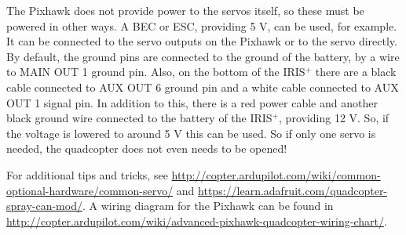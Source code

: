 \documentclass[titlepage,11pt,a4paper]{article}
\begin{document}
The Pixhawk does not provide power to the servos itself, so these must
be powered in other ways. A BEC or ESC, providing 5 V, can be used,
for example. It can be connected to the servo outputs on the Pixhawk
or to the servo directly. By default, the ground pins are connected to
the ground of the battery, by a wire to MAIN OUT 1 ground pin. Also,
on the bottom of the IRIS$^+$ there are a black cable connected to AUX
OUT 6 ground pin and a white cable connected to AUX OUT 1 signal
pin. In addition to this, there is a red power cable and another black
ground wire connected to the battery of the IRIS$^+$, providing 12
V. So, if the voltage is lowered to around 5 V this can be used. So if
only one servo is needed, the quadcopter does not even needs to be
opened!

For additional tips and tricks, see
\url{http://copter.ardupilot.com/wiki/common-optional-hardware/common-servo/}
and \url{https://learn.adafruit.com/quadcopter-spray-can-mod/}. A
wiring diagram for the Pixhawk can be found in
\url{http://copter.ardupilot.com/wiki/advanced-pixhawk-quadcopter-wiring-chart/}.
\end{document}
